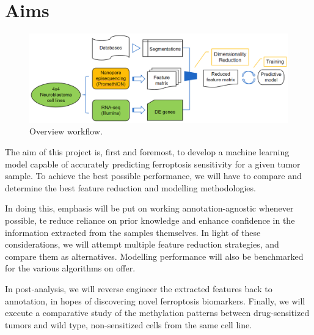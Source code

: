 \chapter[Aims]%
{Aims}

\begin{figure}[ht]
	\begin{center}
		\includegraphics[width = \textwidth]{Fig/overview_temp.png}
	\end{center}
	\caption{Overview workflow.}
\end{figure}

The aim of this project is, first and foremost, to develop a machine learning model capable of accurately predicting ferroptosis sensitivity for a given tumor sample. To achieve the best possible performance, we will have to compare and determine the best feature reduction and modelling methodologies. 

In doing this, emphasis will be put on working annotation-agnostic whenever possible, te reduce reliance on prior knowledge and enhance confidence in the information extracted from the samples themselves. In light of these considerations, we will attempt multiple feature reduction strategies, and compare them as alternatives. Modelling performance will also be benchmarked for the various algorithms on offer. 

In post-analysis, we will reverse engineer the extracted features back to annotation, in hopes of discovering novel ferroptosis biomarkers. Finally, we will execute a comparative study of the methylation patterns between drug-sensitized tumors and wild type, non-sensitized cells from the same cell line.